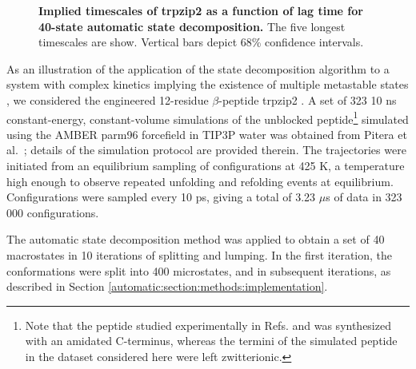 \begin{figure}[tbp]
  \begin{center}
  \end{center}
  \caption{{\bf Implied timescales of trpzip2 as a function of lag time for 40-state automatic state decomposition.}  The five longest timescales are show.  Vertical bars depict 68\% confidence intervals.}
  \label{automatic:figure:trpzip2-timescales}
\end{figure}

As an illustration of the application of the state decomposition algorithm to a system with complex kinetics implying the existence of multiple metastable states \cite{yang:2004c}, we considered the engineered 12-residue $\beta$-peptide trpzip2 \cite{cochran:2001a}.
A set of 323 10 ns constant-energy, constant-volume simulations of the unblocked peptide\footnote{Note that the peptide studied experimentally in Refs. \cite{cochran:2001a} and \cite{yang:2004c} was synthesized with an amidated C-terminus, whereas the termini of the simulated peptide in the dataset considered here were left zwitterionic.} simulated using the AMBER parm96 forcefield \cite{AMBER-parm96} in TIP3P water \cite{jorgensen:1983a} was obtained from Pitera et al.\ \cite{pitera:2006a}; 
details of the simulation protocol are provided therein.
The trajectories were initiated from an equilibrium sampling of configurations at 425 K, a temperature high enough to observe repeated unfolding and refolding events at equilibrium.
Configurations were sampled every 10 ps, giving a total of 3.23 $\mu$s of data in 323 000 configurations.

The automatic state decomposition method was applied to obtain a set of 40 macrostates in 10 iterations of splitting and lumping.
In the first iteration, the conformations were split into 400 microstates, and in subsequent iterations, as described in Section \ref{automatic:section:methods:implementation}.

